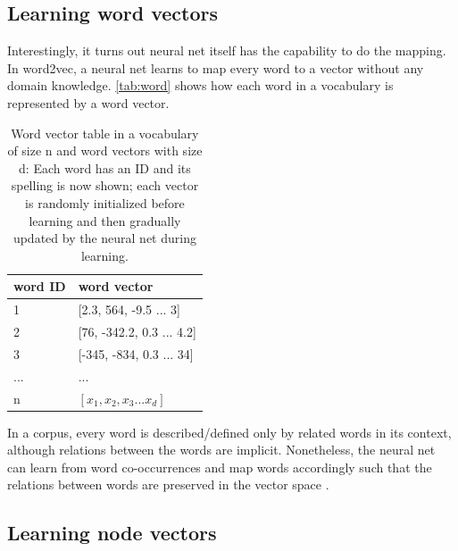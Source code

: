 \documentclass{article}
\begin{document}
\subsection{Learning word vectors}
Interestingly, it turns out neural net itself has the capability to do the 
mapping.
In word2vec, a neural net learns to map every word to a vector without any 
domain knowledge.
\autoref{tab:word} shows how each word in a vocabulary is represented by a word 
vector.
\begin{table}[h]
	\centering
	\begin{tabularx}{0.5\textwidth}{|X|X|} \hline
		word ID & word vector \\ \hline
		1 & [2.3, 564, -9.5 ... 3] \\ \hline
		2 & [76, -342.2, 0.3 ... 4.2] \\ \hline
		3 & [-345, -834, 0.3 ... 34] \\ \hline
		... & ... \\ \hline
		n & $ [x_1, x_2, x_3 ... x_d] $ \\ \hline
	\end{tabularx}
	\caption{Word vector table in a vocabulary of size n and word vectors with 
	size d: 
	Each word has an ID and its spelling is now shown;
	each vector is randomly initialized before learning and then gradually 
	updated by the neural net during learning.}
	\label{tab:word}
\end{table}
In a corpus, every word is described/defined only by related 
words in its context, although relations between the words are implicit. 
Nonetheless, the neural net can learn from word co-occurrences and map words 
accordingly such that the relations between words are preserved in the vector 
space \cite{mikolov2013distributed}.

\subsection{Learning node vectors}
\end{document}
